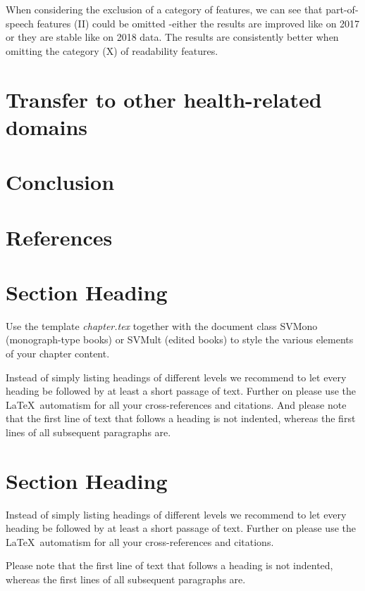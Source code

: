 \documentclass[graybox]{svmult}
\begin{document}
When considering the exclusion of a category of features, we can see that part-of-speech features (II) could be omitted -either the results are improved like on 2017 or they are stable like on 2018 data. The results are consistently better when omitting the category (X) of readability features. 

\section{Transfer to other health-related domains}

\section{Conclusion}

\section{References}

\newpage

\section{Section Heading}
\label{sec:1}
Use the template \emph{chapter.tex} together with the document class SVMono (monograph-type books) or SVMult (edited books) to style the various elements of your chapter content.

Instead of simply listing headings of different levels we recommend to let every heading be followed by at least a short passage of text.  Further on please use the \LaTeX\ automatism for all your cross-references and citations. And please note that the first line of text that follows a heading is not indented, whereas the first lines of all subsequent paragraphs are.

\section{Section Heading}
\label{sec:2}
Instead of simply listing headings of different levels we recommend to let every heading be followed by at least a short passage of text.  Further on please use the \LaTeX\ automatism for all your cross-references and citations.

Please note that the first line of text that follows a heading is not indented, whereas the first lines of all subsequent paragraphs are.
\end{document}
